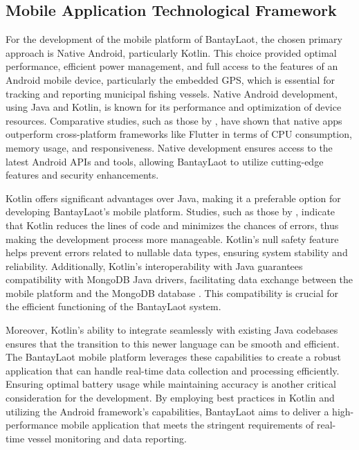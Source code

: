 \documentclass{icsthesis}
\begin{document}
\begin{mainmatter}
            \subsection{Mobile Application Technological Framework}
            For the development of the mobile platform of BantayLaot, the chosen primary approach is Native Android, particularly Kotlin. This choice provided optimal performance, efficient power management, and full access to the features of an Android mobile device, particularly the embedded GPS, which is essential for tracking and reporting municipal fishing vessels. Native Android development, using Java and Kotlin, is known for its performance and optimization of device resources. Comparative studies, such as those by \citep{Hussain2021}, have shown that native apps outperform cross-platform frameworks like Flutter in terms of CPU consumption, memory usage, and responsiveness. Native development ensures access to the latest Android APIs and tools, allowing BantayLaot to utilize cutting-edge features and security enhancements.
            
            Kotlin offers significant advantages over Java, making it a preferable option for developing BantayLaot’s mobile platform. Studies, such as those by \citep{Ardito2020}, indicate that Kotlin reduces the lines of code and minimizes the chances of errors, thus making the development process more manageable. Kotlin's null safety feature helps prevent errors related to nullable data types, ensuring system stability and reliability. Additionally, Kotlin's interoperability with Java guarantees compatibility with MongoDB Java drivers, facilitating data exchange between the mobile platform and the MongoDB database \citep{Fotache2013}. This compatibility is crucial for the efficient functioning of the BantayLaot system.
            
            Moreover, Kotlin's ability to integrate seamlessly with existing Java codebases ensures that the transition to this newer language can be smooth and efficient. The BantayLaot mobile platform leverages these capabilities to create a robust application that can handle real-time data collection and processing efficiently. Ensuring optimal battery usage while maintaining accuracy is another critical consideration for the development. By employing best practices in Kotlin and utilizing the Android framework's capabilities, BantayLaot aims to deliver a high-performance mobile application that meets the stringent requirements of real-time vessel monitoring and data reporting.
            

\end{mainmatter}
\end{document}
